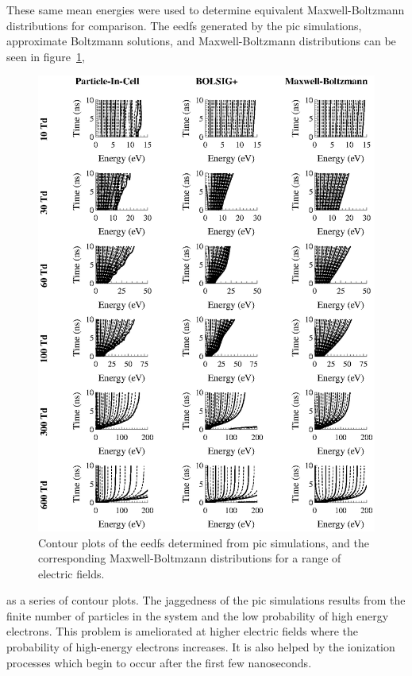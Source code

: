 These same mean energies were used to determine equivalent Maxwell-Boltzmann
distributions for comparison. The \acs{eedf}s generated by the \acs{pic}
simulations, approximate Boltzmann solutions, and Maxwell-Boltzmann
distributions can be seen in figure~\ref{fig:picmb},
\begin{figure}
  \centering
  \includegraphics{./chapters/modeling/figures/picmb.eps}
  \caption{Contour plots of the \acs{eedf}s determined from \acs{pic}
    simulations, and the corresponding Maxwell-Boltmzann distributions for a range
    of electric fields.}
  \label{fig:picmb}
\end{figure}
as a series of contour plots. The jaggedness of the \acs{pic} simulations
results from the finite number of particles in the system and the low
probability of high energy electrons. This problem is ameliorated at higher
electric fields where the probability of high-energy electrons increases. It is
also helped by the ionization processes which begin to occur after the first few
nanoseconds.


